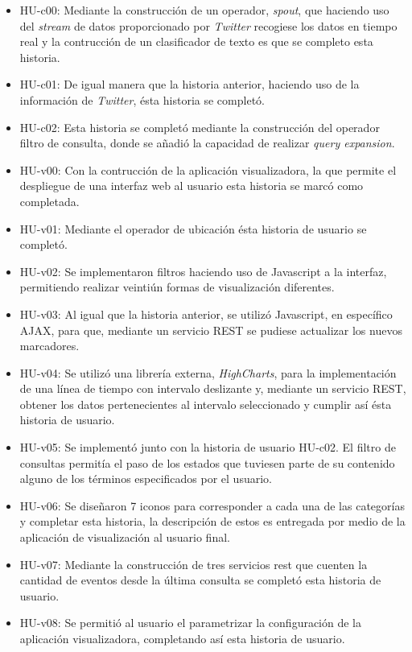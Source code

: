 \begin{itemize}
\item HU-c00: Mediante la construcción de un operador, \textit{spout}, que haciendo uso del \textit{stream} de datos proporcionado por \textit{Twitter} recogiese los datos en tiempo real y la contrucción de un clasificador de texto es que se completo esta historia.
\item HU-c01: De igual manera que la historia anterior, haciendo uso de la información de \textit{Twitter}, ésta historia se completó.
\item HU-c02: Esta historia se completó mediante la construcción del operador filtro de consulta, donde se añadió la capacidad de realizar \textit{query expansion}.
\item HU-v00: Con la contrucción de la aplicación visualizadora, la que permite el despliegue de una interfaz web al usuario esta historia se marcó como completada.
\item HU-v01: Mediante el operador de ubicación ésta historia de usuario se completó.
\item HU-v02: Se implementaron filtros haciendo uso de Javascript a la interfaz, permitiendo realizar veintiún formas de visualización diferentes.
\item HU-v03: Al igual que la historia anterior, se utilizó Javascript, en específico AJAX, para que, mediante un servicio REST se pudiese actualizar los nuevos marcadores.
\item HU-v04: Se utilizó una librería externa, \textit{HighCharts}, para la implementación de una línea de tiempo con intervalo deslizante y, mediante un servicio REST, obtener los datos pertenecientes al intervalo seleccionado y cumplir así ésta historia de usuario.
\item HU-v05: Se implementó junto con la historia de usuario HU-c02. El filtro de consultas permitía el paso de los estados que tuviesen parte de su contenido alguno de los términos especificados por el usuario.
\item HU-v06: Se diseñaron 7 iconos para corresponder a cada una de las categorías y completar esta historia, la descripción de estos es entregada por medio de la aplicación de visualización al usuario final.
\item HU-v07: Mediante la construcción de tres servicios rest que cuenten la cantidad de eventos desde la última consulta se completó esta historia de usuario.
\item HU-v08: Se permitió al usuario el parametrizar la configuración de la aplicación visualizadora, completando así esta historia de usuario.
\end{itemize}

